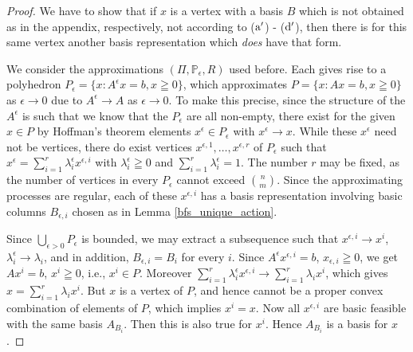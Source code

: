 \documentclass{article}
\newtheorem{corollary}[theorem]{Corollary}
\theoremstyle{definition}
\numberwithin{equation}{section}
\begin{document}
\begin{proof}
    We have to show that if $x$ is a vertex with a basis $B$ 
    which is not obtained as in the appendix, respectively, not according to (${\rm a}'$) - (${\rm d}'$),    then there is for this same vertex another basis representation which
    {\it does} have that form.

    We consider the approximations $(\Pi,\mathbb P_\epsilon,R)$ used before. 
    Each gives rise to a polyhedron $P_\epsilon = \{x: A^\epsilon x=b, x\geqq 0\}$, which
    approximates $P = \{x: Ax=b, x\geqq 0\}$ as $\epsilon \to 0$ due to
    $A^\epsilon \to A$ as $\epsilon \to 0$. To make this precise, 
    since the structure of the $A^\epsilon$ is such that we know that the
    $P_\epsilon$ are all non-empty, there exist for the given $x\in P$ by Hoffman's theorem \cite{11} elements 
    $x^\epsilon \in P_\epsilon$ with $x^\epsilon \to x$. While these
    $x^\epsilon$ need not be vertices, there do exist vertices $x^{\epsilon,1},\dots,x^{\epsilon,r}$
    of $P_\epsilon$
    such that $x^\epsilon = \sum_{i=1}^r \lambda_i^\epsilon x^{\epsilon,i}$ with
    $\lambda_i^\epsilon\geqq 0$ and $\sum_{i=1}^r \lambda_i^\epsilon=1$. The number $r$ may be fixed,
    as the number of vertices in every $P_\epsilon$ cannot exceed ${n \choose m}$. Since the approximating processes
    are regular, each of these $x^{\epsilon,i}$ has a basis representation involving basic
    columns $B_{\epsilon,i}$ chosen as in Lemma {\rm \ref{bfs_unique_action}}.    

    Since $\bigcup_{\epsilon > 0} P_\epsilon$ is bounded,  we may extract 
    a subsequence such that $x^{\epsilon,i} \to x^i$, $\lambda_i^\epsilon \to \lambda_i$, and in addition,
    $B_{\epsilon,i} = B_i$  for every $i$.
    Since $A^\epsilon x^{\epsilon,i} = b$, $x_{\epsilon,i} \geqq 0$, we get $Ax^i=b$, $x^i\geqq0$, i.e.,
    $x^i \in P$. Moreover $\sum_{i=1}^r \lambda_i^\epsilon x^{\epsilon,i} \to\sum_{i=1}^r \lambda_i x^i$, which gives $x=\sum_{i=1}^r \lambda_i x^i$. But $x$ is a vertex of 
    $P$, and hence cannot be a proper convex combination of elements of $P$, which implies
    $x^i=x$. Now all $x^{\epsilon,i}$ are basic feasible with the same basis ${A}_{B_i}$. Then this is also
    true for $x^i$. Hence ${A}_{B_i}$ is a basis for $x$.
    \end{proof}

\end{document}
